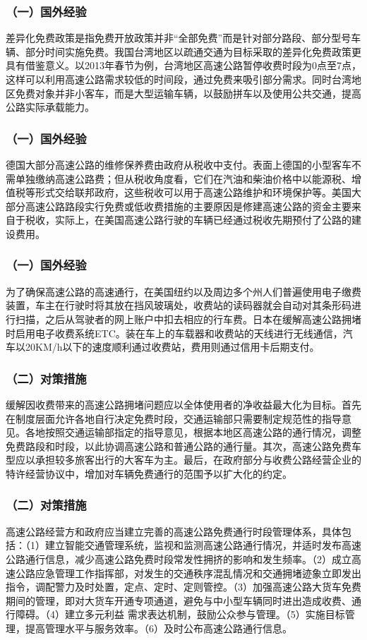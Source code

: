 \documentclass[aspectratio=169, 12pt]{beamer}
\begin{document}
\begin{frame}[plain]
    \frametitle{（一）国外经验}
    差异化免费政策是指免费开放政策并非“全部免费”而是针对部分路段、部分型号车辆、部分时间实施免费。我国台湾地区以疏通交通为目标采取的差异化免费政策更具有借鉴意义。以2013年春节为例，台湾地区高速公路暂停收费时段为0点至7点，这样可以利用高速公路需求较低的时间段，通过免费来吸引部分需求。同时台湾地区免费对象并非小客车，而是大型运输车辆，以鼓励拼车以及使用公共交通，提高公路实际承载能力。
\end{frame}

\begin{frame}[plain]
    \frametitle{（一）国外经验}
    德国大部分高速公路的维修保养费由政府从税收中支付。表面上德国的小型客车不需单独缴纳高速公路费；但从税收角度看，它们在汽油和柴油价格中以能源税、增值税等形式交给联邦政府，这些税收可以用于高速公路维护和环境保护等。美国大部分高速公路路段实行免费或低收费措施的主要原因是修建高速公路的资金主要来自于税收，实际上，在美国高速公路行驶的车辆已经通过税收先期预付了公路的建设费用。
\end{frame}

\begin{frame}[plain]
    \frametitle{（一）国外经验}
    为了确保高速公路的高速通行，在美国纽约以及周边多个州人们普遍使用电子缴费装置，车主在行驶时将其放在挡风玻璃处，收费站的读码器就会自动对其条形码进行扫描，之后从驾驶者的网上账户中扣去相应的行车费。日本在缓解高速公路拥堵时启用电子收费系统ETC。装在车上的车载器和收费站的天线进行无线通信，汽车以20KM/h以下的速度顺利通过收费站，费用则通过信用卡后期支付。
\end{frame}

\begin{frame}[plain]
    \frametitle{（二）对策措施}
    缓解因收费带来的高速公路拥堵问题应以全体使用者的净收益最大化为目标。首先在制度层面允许各地自行决定免费时段，交通运输部只需要制定规范性的指导意见。各地按照交通运输部指定的指导意见，根据本地区高速公路的通行情况，调整免费路段和时段，以此协调高速公路和普通公路的通行量。其次，高速公路免费车型应以承担较多旅客出行的大客车为主。最后，在政府部分与收费公路经营企业的特许经营协议中，增加对车辆免费通行的范围予以扩大化的约定。
\end{frame}

\begin{frame}[plain]
    \frametitle{（二）对策措施}
    高速公路经营方和政府应当建立完善的高速公路免费通行时段管理体系，具体包括：（1）建立智能交通管理系统，监视和监测高速公路通行情况，并适时发布高速公路通行信息，减少高速公路免费时段常发性拥挤的影响和发生频率。（2）成立高速公路应急管理工作指挥部，对发生的交通秩序混乱情况和交通拥堵迹象立即发出指令，调配警力及时处置，定点、定时、定则管控。（3）加强高速公路大货车免费期间的管理，即对大货车开通专项通道，避免与中小型车辆同时进出造成收费、通行障碍。（4）建立多元利益
    需求表达机制，鼓励公众参与管理。（5）实施目标管理，提高管理水平与服务效率。（6）及时公布高速公路通行信息。
\end{frame}
\end{document}
